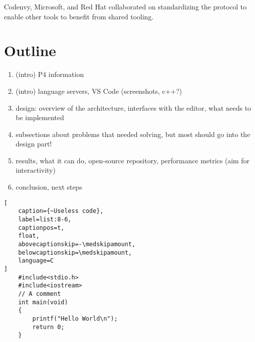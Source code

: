 Coden\-vy, Microsoft, and Red Hat collaborated on standardizing the protocol to
enable other tools to benefit from shared
tooling\cite{sdtimesCodenvyMicrosoft,infoworldMicrosoftbackedLanguage}.

\section{Outline}

\begin{enumerate}
	\item (intro) P4 information
	\item (intro) language servers, VS Code (screenshots, c++?)
	\item design: overview of the architecture, interfaces with the editor, what
		needs to be implemented
	\item subsections about problems that needed solving, but most should go
		into the design part!
	\item results, what it can do, open-source repository, performance metrics
		(aim for interactivity)
	\item conclusion, next steps
\end{enumerate}










\begin{lstlisting}[
	caption={~Useless code},
	label=list:8-6,
	captionpos=t,
	float,
	abovecaptionskip=-\medskipamount,
	belowcaptionskip=\medskipamount,
	language=C
]
	#include<stdio.h>
	#include<iostream>
	// A comment
	int main(void)
	{
		printf("Hello World\n");
		return 0;
	}
\end{lstlisting}


